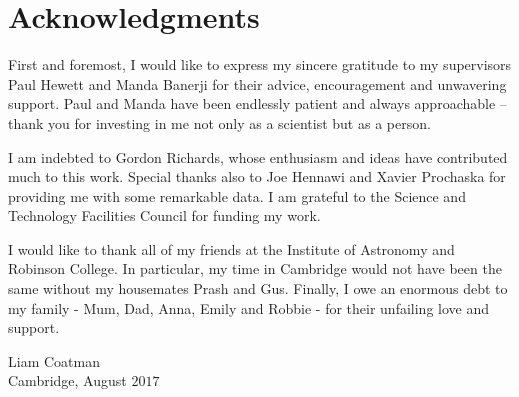 
\bigskip

\begingroup
\let\clearpage\relax
\let\cleardoublepage\relax
\let\cleardoublepage\relax
\chapter*{Acknowledgments}

First and foremost, I would like to express my sincere gratitude to my supervisors Paul Hewett and Manda Banerji for their advice, encouragement and unwavering support.
Paul and Manda have been endlessly patient and always approachable -- thank you for investing in me not only as a scientist but as a person.

I am indebted to Gordon Richards, whose enthusiasm and ideas have contributed much to this work.
Special thanks also to Joe Hennawi and Xavier Prochaska for providing me with some remarkable data.
I am grateful to the Science and Technology Facilities Council for funding my work.

I would like to thank all of my friends at the Institute of Astronomy and Robinson College.
In particular, my time in Cambridge would not have been the same without my housemates Prash and Gus. 
Finally, I owe an enormous debt to my family - Mum, Dad, Anna, Emily and Robbie - for their unfailing love and support.

\begin{flushright}
Liam Coatman \\
Cambridge, August $2017$
\end{flushright}

\endgroup

